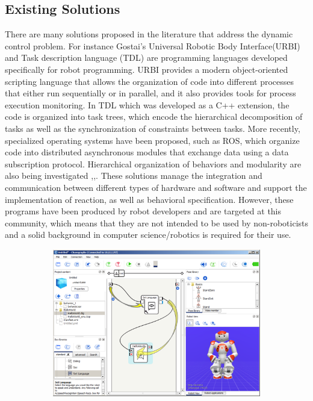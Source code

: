 {\subsection{Existing Solutions}
There are many solutions  proposed in the literature that address the dynamic control problem. For instance Gostai's Universal Robotic Body Interface(URBI)\cite{baillie2008urbi} and Task description language (TDL)\cite{simmons1998task} are programming languages developed specifically for robot programming. URBI provides a modern object-oriented scripting language that allows the organization of code into different processes that either run sequentially or in parallel, and it also provides tools for process execution monitoring. In TDL which was developed as a C++ extension, the code is organized into task trees, which encode the hierarchical decomposition of tasks as well as the synchronization of constraints between tasks.
More recently, specialized operating systems have been proposed, such as ROS\cite{quigley2009ros}, which organize code into distributed asynchronous modules that exchange data using a data subscription protocol. Hierarchical organization of behaviors and modularity are also being investigated \cite{jaeger1998dual},\cite{Baldassarre:2013:CRM:2560111},\cite{hurdus2008behavioral}. These solutions manage the integration and communication between different types of hardware and software and support the implementation of reaction, as well as behavioral specification. However, these programs have been produced by robot developers and are targeted at this community, which means that they are not intended to be used by non-roboticists and a solid background in computer science/robotics is required for their use.
\begin{figure}[H]
\centering
\begin{subfigure}[b]{0.5\textwidth}
\includegraphics[width=\textwidth]{assets/helloworld_cho_dlg_05.png}

\end{subfigure}
\end{figure}}

